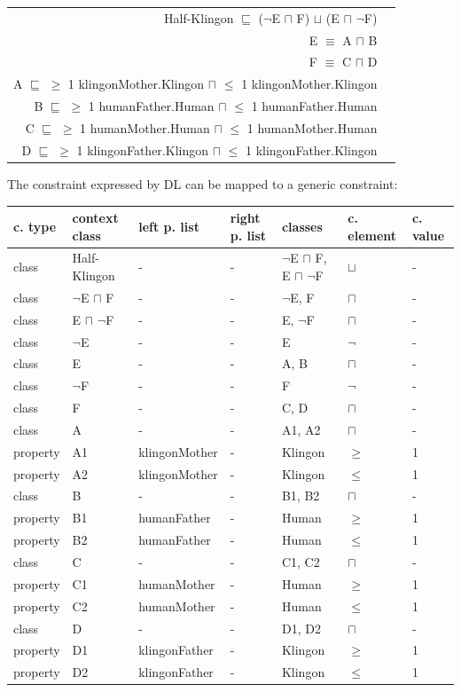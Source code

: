 \documentclass{llncs}
\newenvironment{gcotable}{
  \scriptsize
  \sffamily
  \vspace{0.3cm}
	\begin{center}
  \begin{tabular}{l|l|l|l|l|l|l}
  \hline
  \textbf{c. type} & \textbf{context class} & \textbf{left p. list} & \textbf{right p. list} & \textbf{classes} & \textbf{c. element} & \textbf{c. value} \\
  \hline

}{
  \hline
  \end{tabular}
	\end{center}
}
\newenvironment{DL}{
  \vspace{0.3cm}
	\begin{center}
  \begin{tabular}{r l}

}{
  \end{tabular}
	\end{center}
}
\begin{document}
\begin{DL}
Half-Klingon $\sqsubseteq$ ($\neg$E $\sqcap$ F) $\sqcup$ (E $\sqcap$ $\neg$F) \\ 
E $\equiv$ A $\sqcap$ B \\
F $\equiv$ C $\sqcap$ D \\
A $\sqsubseteq$ $\geq$ 1 klingonMother.Klingon $\sqcap$ $\leq$ 1 klingonMother.Klingon \\
B $\sqsubseteq$ $\geq$ 1 humanFather.Human $\sqcap$ $\leq$ 1 humanFather.Human \\
C $\sqsubseteq$ $\geq$ 1 humanMother.Human $\sqcap$ $\leq$ 1 humanMother.Human \\
D $\sqsubseteq$ $\geq$ 1 klingonFather.Klingon $\sqcap$ $\leq$ 1 klingonFather.Klingon \\
\end{DL}

The constraint expressed by DL can be mapped to a generic constraint:

\begin{gcotable}
class & Half-Klingon & - & - & $\neg$E $\sqcap$ F, E $\sqcap$ $\neg$F & $\sqcup$ & - \\
class & $\neg$E $\sqcap$ F & - & - & $\neg$E, F & $\sqcap$ & - \\
class & E $\sqcap$ $\neg$F & - & - & E, $\neg$F & $\sqcap$ & - \\
class & $\neg$E & - & - & E & $\neg$ & - \\
class & E & - & - & A, B & $\sqcap$ & - \\
class & $\neg$F & - & - & F & $\neg$ & - \\
class & F & - & - & C, D & $\sqcap$ & - \\
class & A & - & - & A1, A2 & $\sqcap$ & - \\
property & A1 & klingonMother & - & Klingon & $\geq$ & 1 \\
property & A2 & klingonMother & - & Klingon & $\leq$ & 1 \\
class & B & - & - & B1, B2 & $\sqcap$ & - \\
property & B1 & humanFather & - & Human & $\geq$ & 1 \\
property & B2 & humanFather & - & Human & $\leq$ & 1 \\
class & C & - & - & C1, C2 & $\sqcap$ & - \\
property & C1 & humanMother & - & Human & $\geq$ & 1 \\
property & C2 & humanMother & - & Human & $\leq$ & 1 \\
class & D & - & - & D1, D2 & $\sqcap$ & - \\
property & D1 & klingonFather & - & Klingon & $\geq$ & 1 \\
property & D2 & klingonFather & - & Klingon & $\leq$ & 1 \\
\end{gcotable}
\end{document}
